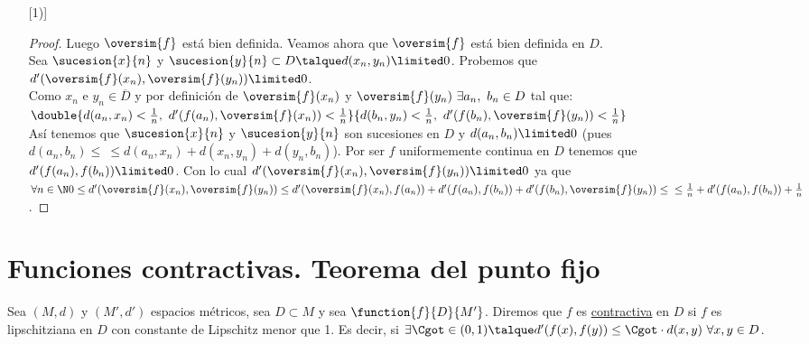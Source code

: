\begin{proposicion}
\begin{enumerate} [1)]
\begin{proof}
	Luego $\oversim{f}$ está bien definida. Veamos ahora que $\oversim{f}$ está bien definida en $D$.\\ Sea $\sucesion{x}{n}$ y $\sucesion{y}{n} \subset D\talque d(x_n,y_n)\limited 0$. Probemos que $d'(\oversim{f}(x_n),\oversim{f}(y_n))\limited 0$.\\
	Como $x_n$ e $y_n\in \overline{D}$ y por definición de $\oversim{f}(x_n)$ y $\oversim{f}(y_n)\ \exists a_n,\ b_n\in D$ tal que:\\
	$\double{d(a_n,x_n)<\frac{1}{n},\ d'(f(a_n),\oversim{f}(x_n))<\frac{1}{n}}{d(b_n,y_n)<\frac{1}{n},\ d'(f(b_n),\oversim{f}(y_n))<\frac{1}{n}}$\\
	Así tenemos  que $\sucesion{x}{n}$ y $\sucesion{y}{n}$ son sucesiones en $D$ y $d(a_n,b_n)\limited 0$ (pues $d(a_n,b_n)\leq\ \leq d(a_n,x_n)+d(x_n,y_n)+d(y_n,b_n)$). Por ser $f$ uniformemente continua en $D$ tenemos que $d'(f(a_n),f(b_n))\limited 0$. Con lo cual $d'(\oversim{f}(x_n),\oversim{f}(y_n))\limited 0$ ya que $\forall n\in\N\\
	0\leq d'(\oversim{f}(x_n),\oversim{f}(y_n))\leq d'(\oversim{f}(x_n),f(a_n))+d'(f(a_n),f(b_n))+d'(f(b_n),\oversim{f}(y_n))\leq\\\leq\frac{1}{n}+d'(f(a_n),f(b_n))+\frac{1}{n}$.
	\end{proof}
	\end{enumerate}
	\end{proposicion}
	
	\section{Funciones contractivas. Teorema del punto fijo}
	
	\begin{defi} Sea $(M,d)$ y $(M',d')$ espacios métricos, sea $D\subset M$ y sea $\function{f}{D}{M'}$. Diremos que $f$ es \underline{contractiva} en $D$ si $f$ es lipschitziana en $D$ con constante de Lipschitz menor que 1. Es decir, si $\exists\Cgot\in(0,1)\talque d'(f(x),f(y))\leq \Cgot\cdot d(x,y)\ \forall x,y\in D$.
	\end{defi}
	
